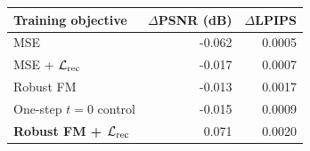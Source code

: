 \begin{tabular}{lrr}
\toprule
Training objective & $\Delta$PSNR (dB) & $\Delta$LPIPS \\
\midrule
MSE & -0.062 & 0.0005 \\
MSE + $\mathcal L_{\rm rec}$ & -0.017 & 0.0007 \\
Robust FM & -0.013 & 0.0017 \\
One-step $t=0$ control & -0.015 & 0.0009 \\
\bfseries Robust FM + $\mathcal L_{\rm rec}$ & 0.071 & 0.0020 \\
\bottomrule
\end{tabular}
